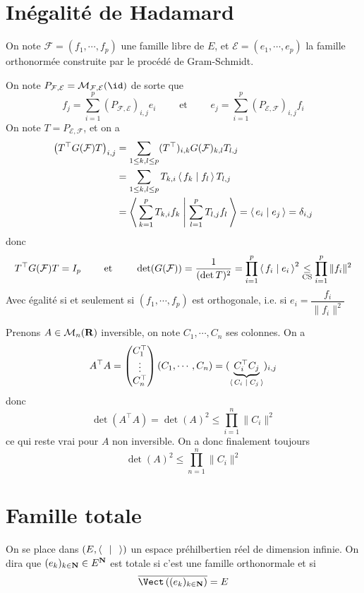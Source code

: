 \section{Inégalité de Hadamard}

On note $\mathcal  F=(f_1, \cdots , f_p)$ une famille libre de $E$, et  $\mathcal  E=(e_1, \cdots , e_p)$ la famille orthonormée construite par le procédé de Gram-Schmidt.

On note $P_{\mathcal  F, \mathcal  E}=\mathcal  M_{\mathcal  F, \mathcal  E}(\id)$ de sorte que \[
    f_j=\sum_{i=1}^p \left( P_{\mathcal  F, \mathcal  E} \right) _{i,j}e_i \qquad  \text{ et } \qquad  e_j=\sum_{i=1}^p \left( P_{\mathcal  E, \mathcal  F} \right) _{i,j}f_i
\] 
On note $T=P_{\mathcal  E, \mathcal  F}  $, et on a \begin{align*}
    \left( T^\top G(\mathcal  F)T \right) _{i,j}&=\sum_{1\leq k,l\leq p} (T^\top)_{i,k}G(\mathcal  F)_{k,l}T_{l,j} \\
                                                &= \sum_{1\leq k,l\leq p} T_{k,i} \scalar{f_k}{f_l} T_{l,j} \\
                                                &= \scalar{\sum_{k=1}^pT_{k,i}f_k}{\sum_{l=1}^pT_{l,j}f_l} =\scalar{e_i}{e_j} =\delta_{i,j}
\end{align*}
donc \[
    T^\top G(\mathcal  F)T=I_p \qquad \text{ et }\qquad \det(G(\mathcal  F))=\frac{1}{(\det T)^2}=\prod_{i=1}^p \scalar{f_i}{e_i} ^2 \underset{\text{CS}}\leq \prod_{i=1}^p \|f_i\|^2 
\] 
Avec égalité si et seulement si $(f_1, \cdots , f_p)$ est orthogonale, i.e. si $e_i=\dfrac{f_i}{\|f_i\|^2 }$ 

Prenons $A \in  \mathcal M_n(\mathbf R)$ inversible, on note $C_1, \cdots  ,C_n$ ses colonnes. On a \[
A^\top A= \begin{pmatrix}
    C_1^\top \\ \vdots \\ C_n^\top
\end{pmatrix} (C_1, \cdots , C_n)= (\underbrace{C_i^\top C_j}_{\scalar{C_i}{C_j} })_{i,j}
\] 
donc \[
    \det(A^\top A)=\det(A)^2\leq \prod_{i=1}^n \|C_i\|^2
\] 
ce qui reste vrai pour $A$ non inversible. On a donc finalement toujours  \[
    \det(A)^2\leq \prod_{n=1}^{n} \|C_i\|^2
\] 

\section{Famille totale}

\begin{dfn}
    On se place dans $(E, \scalar{\;}{\;} )$ un espace préhilbertien réel de dimension infinie. On dira que $(e_k)_{k \in \mathbf N} \in E^{\mathbf N}$ est totale si c'est une famille orthonormale et si \[
        \bar{\Vect\left( (e_k)_{k \in  \N} \right) }=E
    \] 
\end{dfn}

